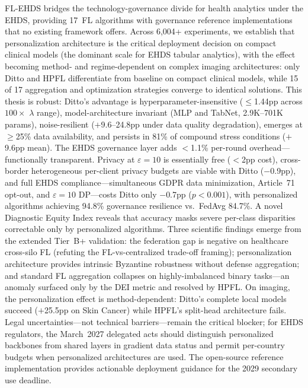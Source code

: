\documentclass[conference]{IEEEtran}
\begin{document}
FL-EHDS bridges the technology-governance divide for health analytics under the EHDS, providing 17~FL algorithms with governance reference implementations that no existing framework offers. Across 6,004+ experiments, we establish that personalization architecture is the critical deployment decision on compact clinical models (the dominant scale for EHDS tabular analytics), with the effect becoming method- and regime-dependent on complex imaging architectures: only Ditto and HPFL differentiate from baseline on compact clinical models, while 15 of 17 aggregation and optimization strategies converge to identical solutions. This thesis is robust: Ditto's advantage is hyperparameter-insensitive ($\leq$1.44pp across $100\times$ $\lambda$ range), model-architecture invariant (MLP and TabNet, 2.9K--701K params), noise-resilient ($+$9.6--24.8pp under data quality degradation), emerges at $\geq$25\% data availability, and persists in 81\% of compound stress conditions ($+$9.6pp mean). The EHDS governance layer adds $<$1.1\% per-round overhead---functionally transparent. Privacy at $\varepsilon{=}10$ is essentially free ($<$2pp cost), cross-border heterogeneous per-client privacy budgets are viable with Ditto ($-$0.9pp), and full EHDS compliance---simultaneous GDPR data minimization, Article~71 opt-out, and $\varepsilon{=}10$ DP---costs Ditto only $-$0.7pp ($p{<}0.001$), with personalized algorithms achieving 94.8\% governance resilience vs.\ FedAvg 84.7\%. A novel Diagnostic Equity Index reveals that accuracy masks severe per-class disparities correctable only by personalized algorithms. Three scientific findings emerge from the extended Tier~B+ validation: the federation gap is negative on healthcare cross-silo FL (refuting the FL-vs-centralized trade-off framing); personalization architecture provides intrinsic Byzantine robustness without defense aggregation; and standard FL aggregation collapses on highly-imbalanced binary tasks---an anomaly surfaced only by the DEI metric and resolved by HPFL. On imaging, the personalization effect is method-dependent: Ditto's complete local models succeed ($+$25.5pp on Skin Cancer) while HPFL's split-head architecture fails. Legal uncertainties---not technical barriers---remain the critical blocker; for EHDS regulators, the March~2027 delegated acts should distinguish personalized backbones from shared layers in gradient data status and permit per-country budgets when personalized architectures are used. The open-source reference implementation provides actionable deployment guidance for the 2029 secondary use deadline.
\end{document}
